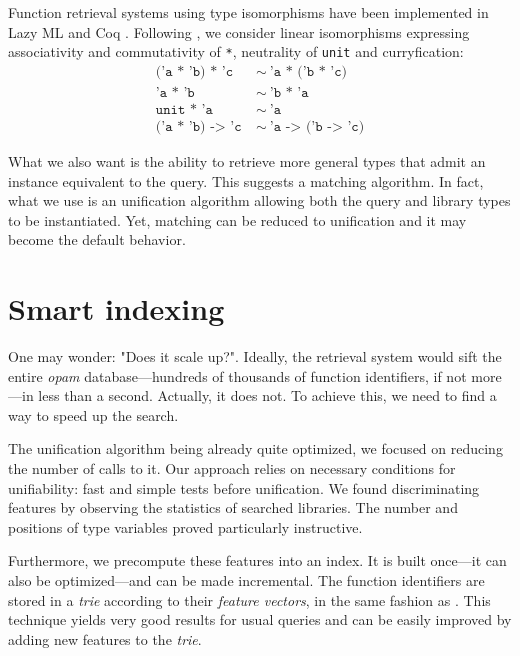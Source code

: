 \documentclass [a4paper,11pt] {scrartcl}
\begin{document}
Function retrieval systems using type isomorphisms have been implemented in Lazy ML \cite {rittri} and Coq \cite {delahaye}. Following \cite {rittri}, we consider linear isomorphisms expressing associativity and commutativity of \texttt {*}, neutrality of \texttt {unit} and curryfication:
\begin {align*}
	\texttt {('a * 'b) * 'c} &\ \sim\ \texttt {'a * ('b * 'c)} \\
	\texttt {'a * 'b} &\ \sim\ \texttt {'b * 'a} \\
	\texttt {unit * 'a} &\ \sim\ \texttt {'a} \\
	\texttt {('a * 'b) -> 'c} &\ \sim\ \texttt {'a -> ('b -> 'c)}
\end {align*}

What we also want is the ability to retrieve more general types that admit an instance equivalent to the query. This suggests a matching algorithm. In fact, what we use is an unification algorithm \cite {boudet} allowing both the query and library types to be instantiated. Yet, matching can be reduced to unification and it may become the default behavior.


\section {Smart indexing}

One may wonder: "Does it scale up?". Ideally, the retrieval system would sift the entire \textit {opam} database—hundreds of thousands of function identifiers, if not more—in less than a second. Actually, it does not. To achieve this, we need to find a way to speed up the search.

The unification algorithm being already quite optimized, we focused on reducing the number of calls to it. Our approach relies on necessary conditions for unifiability: fast and simple tests before unification. We found discriminating features by observing the statistics of searched libraries. The number and positions of type variables proved particularly instructive.

Furthermore, we precompute these features into an index. It is built once—it can also be optimized—and can be made incremental. The function identifiers are stored in a \textit {trie} according to their \textit {feature vectors}, in the same fashion as \cite {schulz}. This technique yields very good results for usual queries and can be easily improved by adding new features to the \textit {trie}.
\end{document}
